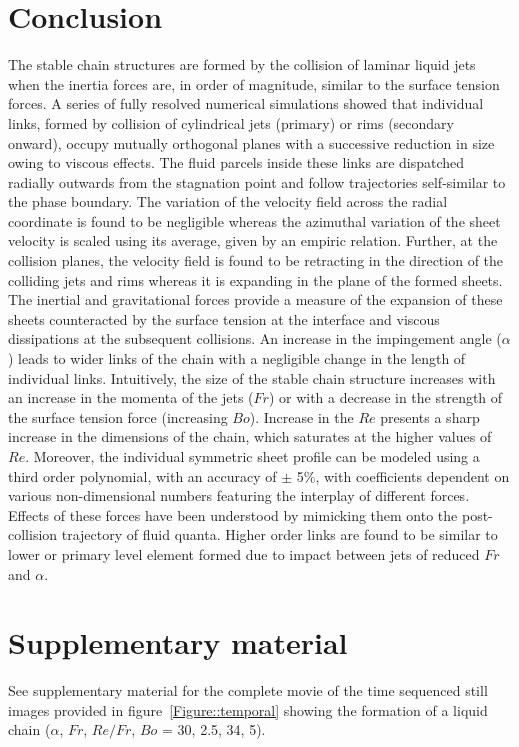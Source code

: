 \documentclass[%
 aip,
 sd,%
amsmath,amssymb,
preprint,%
author-year,%
]{revtex4-1}
\begin{document}
\section{Conclusion}
The stable chain structures are formed by the collision of laminar liquid jets when the inertia forces are, in order of magnitude, similar to the surface tension forces. A series of fully resolved numerical simulations showed that individual links, formed by collision of cylindrical jets (primary) or rims (secondary onward), occupy mutually orthogonal planes with a successive reduction in size owing to viscous effects. The fluid parcels inside these links are dispatched radially outwards from the stagnation point and follow trajectories self-similar to the phase boundary. The variation of the velocity field across the radial coordinate is found to be negligible whereas the azimuthal variation of the sheet velocity is scaled using its average, given by an empiric relation. Further, at the collision planes, the velocity field is found to be retracting in the direction of the colliding jets and rims whereas it is expanding in the plane of the formed sheets. The inertial and gravitational forces provide a measure of the expansion of these sheets counteracted by the surface tension at the interface and viscous dissipations at the subsequent collisions. An increase in the impingement angle ($\alpha$) leads to wider links of the chain with a negligible change in the length of individual links. Intuitively, the size of the stable chain structure increases with an increase in the momenta of the jets ($Fr$) or with a decrease in the strength of the surface tension force (increasing $Bo$). Increase in the $Re$ presents a sharp increase in the dimensions of the chain, which saturates at the higher values of $Re$. Moreover, the individual symmetric sheet profile can be modeled using a third order polynomial, with an accuracy of $\pm$ 5\%, with coefficients dependent on various non-dimensional numbers featuring the interplay of different forces. Effects of these forces have been understood by mimicking them onto the post-collision trajectory of fluid quanta. Higher order links are found to be similar to lower or primary level element formed due to impact between jets of reduced $Fr$ and $\alpha$. 

\section*{Supplementary material}
See supplementary material for the complete movie of the time sequenced still images provided in figure~\ref{Figure::temporal} showing the formation of a liquid chain ($\alpha$, $Fr$, $Re/Fr$, $Bo$ = 30\degree, 2.5, 34, 5).

\end{document}
